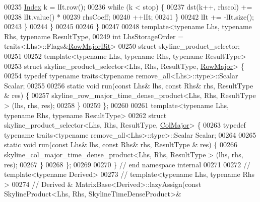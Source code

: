 \begin{DoxyCode}
00235             \hyperlink{namespace_eigen_a62e77e0933482dafde8fe197d9a2cfde}{Index} k = lIt.row();
00236             \textcolor{keywordflow}{while} (k < stop) \{
00237                 dst(k++, rhscol) +=
00238                         lIt.value() *
00239                         rhsCoeff;
00240                 ++lIt;
00241             \}
00242             lIt += -lIt.size();
00243         \}
00244     \}
00245 
00246 \}
00247 
00248 \textcolor{keyword}{template}<\textcolor{keyword}{typename} Lhs, \textcolor{keyword}{typename} Rhs, \textcolor{keyword}{typename} ResultType,
00249         \textcolor{keywordtype}{int} LhsStorageOrder = traits<Lhs>::Flags&\hyperlink{group__flags_gae4f56c2a60bbe4bd2e44c5b19cbe8762}{RowMajorBit}>
00250         \textcolor{keyword}{struct }skyline\_product\_selector;
00251 
00252 \textcolor{keyword}{template}<\textcolor{keyword}{typename} Lhs, \textcolor{keyword}{typename} Rhs, \textcolor{keyword}{typename} ResultType>
00253 \textcolor{keyword}{struct }skyline\_product\_selector<Lhs, Rhs, ResultType, \hyperlink{group__enums_ggaacded1a18ae58b0f554751f6cdf9eb13acfcde9cd8677c5f7caf6bd603666aae3}{RowMajor}> \{
00254     \textcolor{keyword}{typedef} \textcolor{keyword}{typename} traits<typename remove\_all<Lhs>::type>::Scalar Scalar;
00255 
00256     \textcolor{keyword}{static} \textcolor{keywordtype}{void} run(\textcolor{keyword}{const} Lhs& lhs, \textcolor{keyword}{const} Rhs& rhs, ResultType & res) \{
00257         skyline\_row\_major\_time\_dense\_product<Lhs, Rhs, ResultType > (lhs, rhs, res);
00258     \}
00259 \};
00260 
00261 \textcolor{keyword}{template}<\textcolor{keyword}{typename} Lhs, \textcolor{keyword}{typename} Rhs, \textcolor{keyword}{typename} ResultType>
00262 \textcolor{keyword}{struct }skyline\_product\_selector<Lhs, Rhs, ResultType, \hyperlink{group__enums_ggaacded1a18ae58b0f554751f6cdf9eb13a0cbd4bdd0abcfc0224c5fcb5e4f6669a}{ColMajor}> \{
00263     \textcolor{keyword}{typedef} \textcolor{keyword}{typename} traits<typename remove\_all<Lhs>::type>::Scalar Scalar;
00264 
00265     \textcolor{keyword}{static} \textcolor{keywordtype}{void} run(\textcolor{keyword}{const} Lhs& lhs, \textcolor{keyword}{const} Rhs& rhs, ResultType & res) \{
00266         skyline\_col\_major\_time\_dense\_product<Lhs, Rhs, ResultType > (lhs, rhs, res);
00267     \}
00268 \};
00269 
00270 \} \textcolor{comment}{// end namespace internal}
00271 
00272 \textcolor{comment}{// template<typename Derived>}
00273 \textcolor{comment}{// template<typename Lhs, typename Rhs >}
00274 \textcolor{comment}{// Derived & MatrixBase<Derived>::lazyAssign(const SkylineProduct<Lhs, Rhs, SkylineTimeDenseProduct>&
}
\end{DoxyCode}
